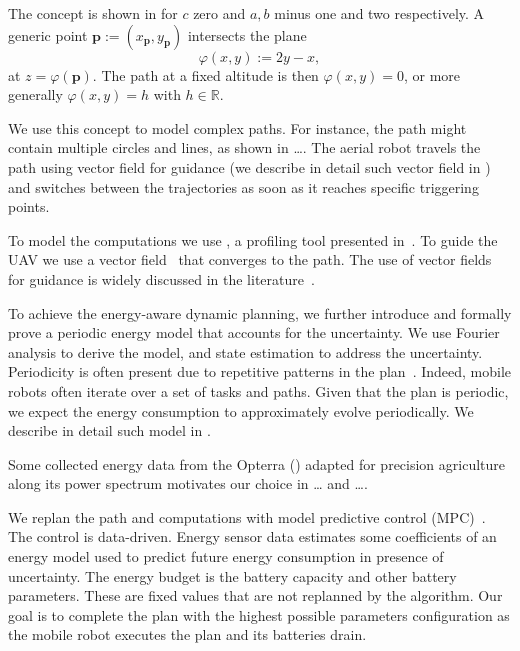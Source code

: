 The concept is shown in  for $c$ zero and $a,b$ minus one and two respectively. A generic point $\mathbf{p}:=(x_{\mathbf{p}},y_{\mathbf{p}})$ intersects the plane
\begin{equation}
  \varphi(x,y):=2y-x,
\end{equation}
at $z=\varphi(\mathbf{p})$. The path at a fixed altitude is then $\varphi(x,y)=0$, or more generally $\varphi(x,y)=h$ with $h\in\mathbb{R}$.

We use this concept to model complex paths. For instance, the path might contain multiple circles and lines{\color{red}, as shown in \dots. The aerial robot travels the path using vector field for guidance (we describe in detail such vector field in ) and switches between the trajectories as soon as it reaches specific triggering points}. 

To model the computations we use \powprof{}, a profiling tool presented in~\citep{seewald2019coarse}. To guide the UAV we use a vector field~\citep{de2017guidance} that converges to the path. The use of vector fields for guidance is widely discussed in the literature~\citep{lindemann2005smoothly,gonccalves2010vector,panagou2014motion,zhou2014vector,kapitanyuk2017guiding,de2017guidance}. 

To achieve the energy-aware dynamic planning, we further introduce and formally prove a periodic energy model that accounts for the uncertainty. We use Fourier analysis to derive the model, and state estimation to address the uncertainty. Periodicity is often present due to repetitive patterns in the plan~\citep{seewald2020mechanical}. Indeed, mobile robots often iterate over a set of tasks and paths. Given that the plan is periodic, we expect the energy consumption to approximately evolve periodically. We describe in detail such model in . 

Some collected energy data from the Opterra () adapted for precision agriculture along its power spectrum motivates our choice {\color{red}in \dots {} and \dots}. 

We replan the path and computations with model predictive control (MPC)~\cite{rawlings2017model}. The control is data-driven. Energy sensor data estimates some coefficients of an energy model used to predict future energy consumption in presence of uncertainty. The energy budget is the battery capacity and other battery parameters. These are fixed values that are not replanned by the algorithm. Our goal is to complete the plan with the highest possible parameters configuration as the mobile robot executes the plan and its batteries drain. 

